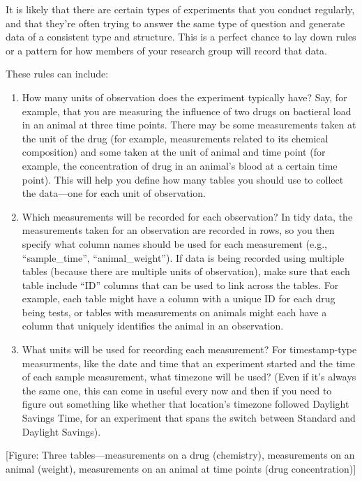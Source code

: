 \documentclass[]{tufte-book}
\providecommand{\tightlist}{%
  \setlength{\itemsep}{0pt}\setlength{\parskip}{0pt}}
\begin{document}
It is likely that there are certain types of experiments that you conduct
regularly, and that they're often trying to answer the same type of
question and generate data of a consistent type and structure. This is
a perfect chance to lay down rules or a pattern for how members of
your research group will record that data.

These rules can include:

\begin{enumerate}
\def\labelenumi{\arabic{enumi}.}
\tightlist
\item
  How many units of observation does the experiment typically have?
  Say, for example, that you are measuring the influence of two drugs on
  bactieral load in an animal at
  three time points. There may be some measurements taken at the unit of the drug
  (for example, measurements related to its chemical composition) and some
  taken at the unit of animal and time point (for example, the concentration of drug in
  an animal's blood at a certain time point). This will help you define how many
  tables you should use to collect the data---one for each unit of observation.
\item
  Which measurements will be recorded for each observation? In tidy data, the measurements
  taken for an observation are recorded in rows, so you then specify what
  column names should be used for each measurement (e.g., ``sample\_time'',
  ``animal\_weight''). If data is being recorded using multiple tables (because there
  are multiple units of observation), make sure that each table include
  ``ID'' columns that can be used to link across the tables. For example, each
  table might have a column with a unique ID for each drug being tests, or tables
  with measurements on animals might each have a column that uniquely identifies
  the animal in an observation.
\item
  What units will be used for recording each measurement? For timestamp-type
  measurments, like the date and time that an experiment started and the time of
  each sample measurement, what timezone will be used? (Even if it's always the
  same one, this can come in useful every now and then if you need to figure out
  something like whether that location's timezone followed Daylight Savings Time,
  for an experiment that spans the switch between Standard and Daylight Savings).
\end{enumerate}

{[}Figure: Three tables---measurements on a drug (chemistry), measurements on an animal (weight),
measurements on an animal at time points (drug concentration){]}
\end{document}

